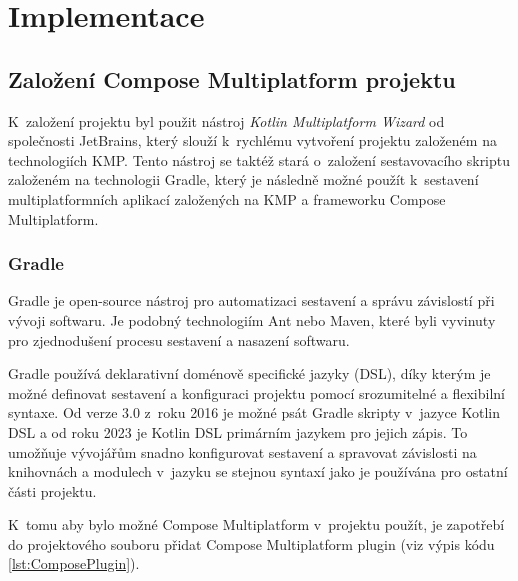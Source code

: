 \chapter{Implementace}


\section{Založení Compose Multiplatform projektu}
K~založení projektu byl použit nástroj \textit{Kotlin Multiplatform Wizard} od společnosti JetBrains, který slouží k~rychlému vytvoření projektu
založeném na technologiích KMP. Tento nástroj se taktéž stará o~založení sestavovacího skriptu založeném na technologii Gradle, který je následně možné 
použít k~sestavení multiplatformních aplikací založených na KMP a frameworku Compose Multiplatform.
 
 



%

\subsection{Gradle} \label{gradleChapter}
Gradle je open-source nástroj pro automatizaci sestavení a správu závislostí při vývoji softwaru. Je 
podobný technologiím Ant nebo Maven, které byli vyvinuty pro zjednodušení procesu sestavení a nasazení softwaru.

Gradle používá deklarativní doménově specifické jazyky (DSL), díky kterým je možné definovat sestavení a konfiguraci projektu pomocí srozumitelné
a flexibilní syntaxe. Od verze 3.0 z~roku 2016 je možné psát Gradle skripty v~jazyce Kotlin DSL a od roku 2023 je Kotlin DSL primárním jazykem 
pro jejich zápis. To umožňuje vývojářům snadno konfigurovat sestavení a spravovat závislosti na knihovnách a modulech v~jazyku se stejnou
syntaxí jako je používána pro ostatní části projektu. 



K~tomu aby bylo možné Compose Multiplatform v~projektu použít, je zapotřebí do projektového souboru  přidat Compose 
Multiplatform plugin (viz výpis kódu \ref{lst:ComposePlugin}).

